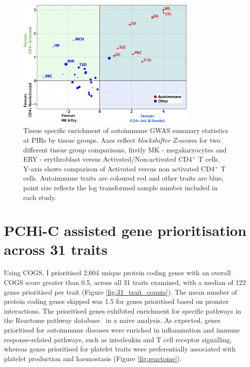 \documentclass[a4paper,11pt]{report}
\begin{document}
\begin{figure}[h]
\centering
\includegraphics[width=0.8\textwidth]{tcell_blockshifter_scatter.pdf}
\caption{Tissue specific enrichment of autoimmune GWAS summary statistics at PIRs by tissue groups. Axes reflect \textit{blockshifter} $Z$-scores for two different tissue group comparisons, firstly MK - megakaryocytes and ERY - erythroblast versus Activated/Non-activated CD4$^{+}$ T cells. Y-axis shows comparison of Activated versus non activated CD4$^{+}$ T cells. Autoimmune traits are coloured red and other traits are blue, point size reflects the log transformed sample number included in each study.}
\label{fig:bs_2}
\end{figure}

\section{PCHi-C assisted gene prioritisation across 31 traits}
\label{sect:tp_reactome}
Using COGS, I prioritised 2,604  unique protein coding genes with an overall COGS score greater than 0.5, across all 31 traits examined, with a median of 122 genes prioritised per trait (Figure \ref{fig:31_trait_counts}). The mean number of protein coding genes skipped was 1.5 for genes prioritised based on promter interactions. The prioritised genes exhibited enrichment for specific pathways in the Reactome pathway database~\citep{FabregatSidiropoulosGarapatiEtAl2016} in a naive analysis. As expected, genes prioritised for autoimmune diseases were enriched in inflammation and immune response-related pathways, such as interleukin and T cell receptor signalling, whereas genes prioritised for platelet traits were preferentially associated with platelet production and haemostasis (Figure \ref{fig:reactome}). 
\end{document}
